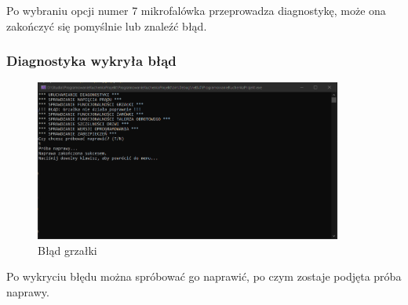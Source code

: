 Po wybraniu opcji numer 7 mikrofalówka przeprowadza diagnostykę, może ona zakończyć się pomyślnie lub znaleźć błąd.
\newpage
\subsubsection{Diagnostyka wykryła błąd}

\begin{figure}[h]
    \centering
    \includegraphics[width=0.9\textwidth]{Menu15.png}
      \caption{Błąd grzałki}
    \label{fig:example}
\end{figure}
Po wykryciu błędu można spróbować go naprawić, po czym zostaje podjęta próba naprawy.